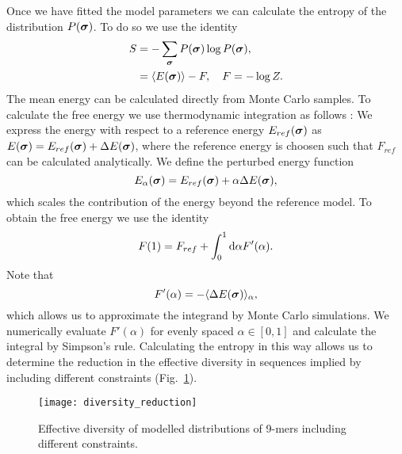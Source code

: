 Once we have fitted the model parameters we can calculate the entropy of the distribution $P(\boldsymbol \sigma)$. To do so we use the identity
\begin{align}
    S &= - \sum_{\boldsymbol \sigma}  P(\boldsymbol \sigma) \log P(\boldsymbol \sigma),  \\
      &= \langle E(\boldsymbol \sigma) \rangle - F, \quad F = - \log Z.
\end{align}
The mean energy can be calculated directly from Monte Carlo samples. To calculate the free energy we use thermodynamic integration as follows \cite{Marchi2019b}: We express the energy with respect to a reference energy $E_{ref}(\boldsymbol \sigma)$ as $E(\boldsymbol \sigma) = E_{ref}(\boldsymbol \sigma) + \Delta E(\boldsymbol\sigma)$, where the reference energy is choosen such that $F_{ref}$ can be calculated analytically. We define the perturbed energy function
\begin{equation}
    E_\alpha(\boldsymbol \sigma) = E_{ref}(\boldsymbol \sigma) + \alpha \Delta E(\boldsymbol\sigma),
\end{equation}
which scales the contribution of the energy beyond the reference model.
To obtain the free energy we use the identity
\begin{equation}
    F(1) = F_{ref} + \int_0^1 \mathrm{d} \alpha F'(\alpha).
\end{equation}
Note that
\begin{equation}
    F'(\alpha) = - \langle \Delta E(\boldsymbol \sigma) \rangle_{\alpha},
\end{equation}
which allows us to approximate the integrand by Monte Carlo simulations. We numerically evaluate $F'(\alpha)$ for evenly spaced $\alpha \in [0, 1]$ and calculate the integral by Simpson's rule. Calculating the entropy in this way allows us to determine the reduction in the effective diversity in sequences implied by including different constraints (Fig.~\ref{figdiversity_reduction}). 

\begin{figure}
    \texttt{[image: diversity\_reduction]}
    \caption{Effective diversity of modelled distributions of 9-mers including different constraints.
    \label{figdiversity_reduction}
    }
\end{figure}





